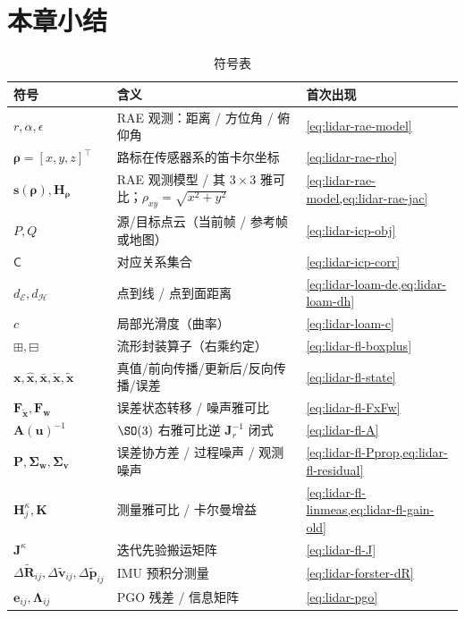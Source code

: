 \section*{本章小结}

\begin{table}[H]\centering\small
\caption{符号表}
\begin{tabular}{lll}
\toprule
符号 & 含义 & 首次出现 \\
\midrule
$r,\alpha,\epsilon$ & RAE 观测：距离 / 方位角 / 俯仰角 & \cref{eq:lidar-rae-model} \\
$\boldsymbol{\rho}=[x,y,z]^\top$ & 路标在传感器系的笛卡尔坐标 & \cref{eq:lidar-rae-rho} \\
$\mathbf{s}(\boldsymbol{\rho}),\mathbf{H}_{\boldsymbol{\rho}}$ & RAE 观测模型 / 其 $3\times3$ 雅可比；$\rho_{xy}=\sqrt{x^2+y^2}$ & \cref{eq:lidar-rae-model,eq:lidar-rae-jac} \\
$P,Q$ & 源/目标点云（当前帧 / 参考帧或地图） & \cref{eq:lidar-icp-obj} \\
$\mathsf{C}$ & 对应关系集合 & \cref{eq:lidar-icp-corr} \\
$d_{\mathcal{E}},d_{\mathcal{H}}$ & 点到线 / 点到面距离 & \cref{eq:lidar-loam-de,eq:lidar-loam-dh} \\
$c$ & 局部光滑度（曲率） & \cref{eq:lidar-loam-c} \\
$\boxplus,\boxminus$ & 流形封装算子（右乘约定） & \cref{eq:lidar-fl-boxplus} \\
$\mathbf{x},\hat{\mathbf{x}},\bar{\mathbf{x}},\check{\mathbf{x}},\tilde{\mathbf{x}}$ & 真值/前向传播/更新后/反向传播/误差 & \cref{eq:lidar-fl-state} \\
$\mathbf{F}_{\tilde{\mathbf{x}}},\mathbf{F}_{\mathbf{w}}$ & 误差状态转移 / 噪声雅可比 & \cref{eq:lidar-fl-FxFw} \\
$\mathbf{A}(\mathbf{u})^{-1}$ & $\SO(3)$ 右雅可比逆 $\mathbf{J}_r^{-1}$ 闭式 & \cref{eq:lidar-fl-A} \\
$\mathbf{P},\boldsymbol{\Sigma}_{\mathbf{w}},\boldsymbol{\Sigma}_{\mathbf{v}}$ & 误差协方差 / 过程噪声 / 观测噪声 & \cref{eq:lidar-fl-Pprop,eq:lidar-fl-residual} \\
$\mathbf{H}^\kappa_j,\mathbf{K}$ & 测量雅可比 / 卡尔曼增益 & \cref{eq:lidar-fl-linmeas,eq:lidar-fl-gain-old} \\
$\mathbf{J}^\kappa$ & 迭代先验搬运矩阵 & \cref{eq:lidar-fl-J} \\
$\Delta\tilde{\mathbf{R}}_{ij},\Delta\tilde{\mathbf{v}}_{ij},\Delta\tilde{\mathbf{p}}_{ij}$ & IMU 预积分测量 & \cref{eq:lidar-forster-dR} \\
$\mathbf{e}_{ij},\boldsymbol{\Lambda}_{ij}$ & PGO 残差 / 信息矩阵 & \cref{eq:lidar-pgo} \\
\bottomrule
\end{tabular}
\end{table}

